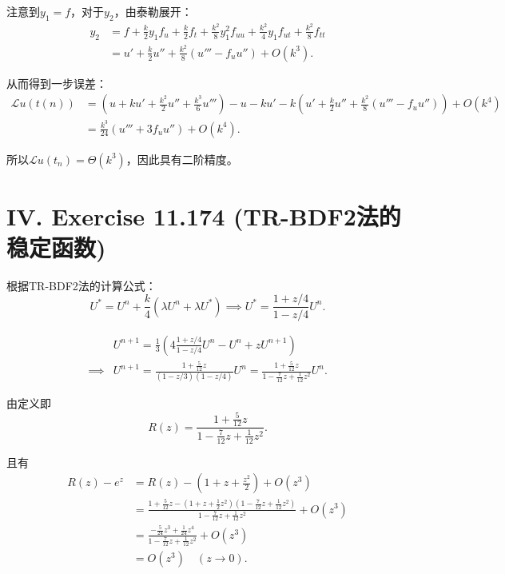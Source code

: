 \documentclass[twoside,a4paper]{article}
\begin{document}
\;\;\;\;\;\;注意到$y_1=f$，对于$y_2$，由泰勒展开：
\begin{align*}
    y_2 &= f+\frac{k}{2}y_1f_u+\frac{k}{2}f_t+\frac{k^2}{8}y_1^2f_{uu}+\frac{k^2}{4}y_1f_{ut}+\frac{k^2}{8}f_{tt}\\
    &= u' + \frac{k}{2}u'' + \frac{k^2}{8}(u'''-f_uu'') + O(k^3).
\end{align*}

从而得到一步误差：
\begin{align*}
    \mathcal{L}u(t(n))&=(u + ku'+\frac{k^2}{2}u''+\frac{k^3}{6}u''')-u - ku' - k(u' + \frac{k}{2}u'' + \frac{k^2}{8}(u'''-f_uu'')) + O(k^4)\\
    &= \frac{k^3}{24}(u'''+3f_uu'') + O(k^4).
\end{align*}

所以$\mathcal{L}u(t_n)=\Theta(k^3)$，因此具有二阶精度。

\section*{IV. Exercise 11.174 (TR-BDF2法的稳定函数)}

\;\;\;\;\;\;根据TR-BDF2法的计算公式：
\begin{equation*}
    U^*=U^n+\frac{k}{4}(\lambda U^n + \lambda U^*) \implies U^*=\frac{1+z/4}{1-z/4}U^n.
\end{equation*}

\begin{align*}
    &U^{n+1}=\frac{1}{3}\left(4\frac{1+z/4}{1-z/4}U^n - U^n + zU^{n+1}\right)\\
    \implies & U^{n+1}=\frac{1+\frac{5}{12}z}{(1-z/3)(1-z/4)}U^n=\frac{1+\frac{5}{12}z}{1-\frac{7}{12}z+\frac{1}{12}z^2}U^n.
\end{align*}

由定义即
\begin{equation*}
    R(z)=\frac{1+\frac{5}{12}z}{1-\frac{7}{12}z+\frac{1}{12}z^2}.
\end{equation*}

且有
\begin{align*}
    R(z)-e^z &= R(z) - (1+z+\frac{z^2}{2}) + O(z^3)\\
    &= \frac{1+\frac{5}{12}z - \left(1+z+\frac{1}{2}z^2\right)\left(1-\frac{7}{12}z+\frac{1}{12}z^2\right)}{1-\frac{7}{12}z+\frac{1}{12}z^2} + O(z^3)\\
    &= \frac{-\frac{5}{24}z^3+\frac{1}{24}z^4}{1-\frac{7}{12}z+\frac{1}{12}z^2}+O(z^3)\\
    &= O(z^3) \quad (z\to 0).
\end{align*}
\end{document}
